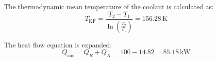 The thermodynamic mean temperature of the coolant is calculated as:  
\[
T_{\text{KF}} = \frac{T_2 - T_1}{\ln\left(\frac{T_2}{T_1}\right)} = 156.28 \, \text{K}
\]  

The heat flow equation is expanded:  
\[
Q_{\text{aus}} = Q_R + Q_K = 100 - 14.82 = 85.18 \, \text{kW}
\]